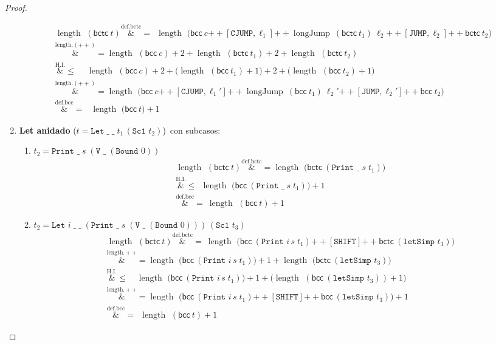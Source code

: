 \documentclass[12pt]{article}
\newcommand{\length}{\operatorname{length\  }}
\DeclareMathOperator{\longJumpOp}{longJump}
\newcommand{\longJump}[2]{\longJumpOp\ #1\ #2}
\newcommand{\bcc}[1]{\mathsf{bcc}\ #1}
\newcommand{\bctc}[1]{\mathsf{bctc}\ #1}
\newcommand{\concat}{\mathbin{+\!\!+}}   %
\theoremstyle{remark}
\newcommand{\overeqa}[1]{\overset{\mathrm{#1}}&{=}}
\newcommand{\overlea}[1]{\overset{\mathrm{#1}}&{\le}}
\begin{document}
\begin{proof}
\begin{enumerate}[label=\textbf{(\alph*)},wide,topsep=4pt]
\begin{align*}
\length(\bctc{t}) \overeqa{def.bctc} \ \ \length\!\bigl(\bcc{c}\concat
    [\texttt{CJUMP},\ell_1]\concat
    \longJump{(\bctc{t_1})}{{\ell_2}}\concat
    [\texttt{JUMP},\ell_2]\concat
    \bctc{t_2}\bigr) \\
 \overeqa{length.(++)} \length(\bcc{c})+2+\length(\bctc{t_1})+2+\length(\bctc{t_2}) \\
 \overlea{H.I.} \quad \  \length(\bcc{c})+2+\bigl(\length(\bcc{t_1})+1\bigr)+2+\bigl(\length(\bcc{t_2})+1\bigr) \\
 \overeqa{length.(++)}  \length\!\bigl(\bcc{c}\concat
    [\texttt{CJUMP},\ell_1']\concat
    \longJump{(\bcc{t_1})}{{\ell_2'}}\concat
    [\texttt{JUMP},\ell_2']\concat
    \bcc{t_2}\bigr) \\
 \overeqa{def.bcc} \ \ \; \length\bigl(\bcc{t}\bigr)+1
\end{align*}


\item \textbf{Let anidado}  
      ($t=\texttt{Let}\;\_\;\_\;t_1\,(\texttt{Sc1 }t_2)$)\, con subcasos:

\begin{enumerate}[label=\textbf{(\roman*)}, leftmargin=6em]
  \item $t_2=\texttt{Print }\_\;s\;(\texttt{V }\_\;(\texttt{Bound }0))$
  \begin{align*}
      \length(\bctc{t}) \overeqa{def.bctc} \length\bigl(\bctc{(\texttt{Print }\_\;s\;t_1)}\bigr) \\ 
      \overlea{H.I.} \ \ \length\bigl(\bcc{(\texttt{Print }\_\;s\;t_1)}\bigr)+1 \\
      \overeqa{def.bcc} \  \length(\bcc{t})+1 
  \end{align*}
  
  \item $t_2=\texttt{Let }i\;\_\;\_\;(\texttt{Print }\_\;s\;(\texttt{V }\_\;(\texttt{Bound }0)))\,(\texttt{Sc1 }t_3)$
  \begin{align*}
  \length(\bctc{t})
     \overeqa{def.bctc} \ \length\!\bigl(
         \bcc{(\texttt{Print }i\,s\;t_1)}\concat
         [\texttt{SHIFT}]\concat
         \bctc{(\texttt{letSimp }t_3)}
       \bigr) \\
     \overeqa{length.++} \length\!\bigl(\bcc{(\texttt{Print }i\,s\;t_1)}\bigr)+1+
       \length\!\bigl(\bctc{(\texttt{letSimp }t_3)}\bigr)        \\
     \overlea{H.I.} \quad \length\!\bigl(\bcc{(\texttt{Print }i\,s\;t_1)}\bigr)+1+
        \bigl(\length(\bcc{(\texttt{letSimp }t_3)})+1\bigr)      \\
     \overeqa{length.++} \length\!\bigl(
         \bcc{(\texttt{Print }i\,s\;t_1)}\concat
         [\texttt{SHIFT}]\concat
         \bcc{(\texttt{letSimp }t_3)} 
       \bigr) + 1\\
     \overeqa{def.bcc} \ \  \length(\bcc{t})+1
  \end{align*}


\end{enumerate}
\end{enumerate}
\end{proof}
\end{document}
